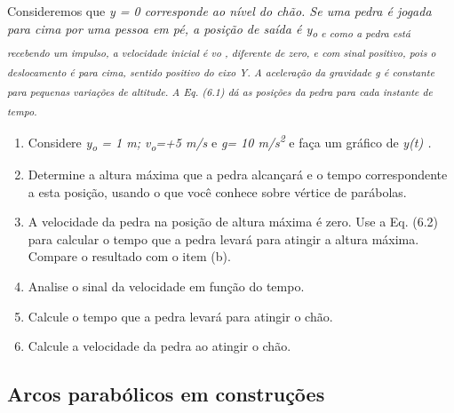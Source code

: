 Consideremos que \textit{y = 0 corresponde ao nível do chão. Se uma pedra é jogada para cima por uma pessoa em pé, a posição de saída é  y\textsubscript{o  e como a pedra está recebendo um impulso, a velocidade inicial é vo , diferente de zero, e com sinal positivo, pois o deslocamento é para cima, sentido positivo do eixo Y.  A aceleração da gravidade g é constante para pequenas variações de altitude. A Eq. (6.1) dá as posições da pedra para cada instante de tempo.}}

\begin{enumerate}
	\item Considere \textit{y\textsubscript{o} = 1 m; v\textsubscript{o}=+5 m/s }e\textit{ g= 10 m/s\textsuperscript{2}} e faça um gráfico de  \textit{y(t)  .}

	\item Determine a altura máxima que a pedra alcançará e o tempo correspondente a esta posição, usando o que você conhece sobre vértice de parábolas.

	\item A velocidade da pedra na posição de altura máxima é zero. Use a Eq. (6.2) para calcular o tempo que a pedra levará para atingir a altura máxima. Compare o resultado com o item (b).

	\item Analise o sinal da velocidade em função do tempo.

	\item Calcule o tempo que a pedra levará para atingir o chão.

	\item Calcule a velocidade da pedra ao atingir o chão.
\end{enumerate}

\subsection{Arcos parabólicos em construções}

